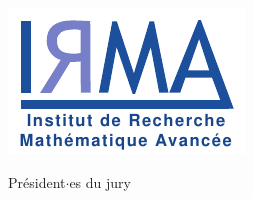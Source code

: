{\begin{minipage}[c]{6in}
\begin{minipage}[c]{1.5in}
    \end{minipage}
    \hfill
    \begin{minipage}[c]{1.5in}
        \includegraphics[width=.92\linewidth]{logos/logo-irma.pdf}
    \end{minipage}
    \hfill
\end{minipage}
%
\hfill
%
\begin{minipage}[c]{2.8in}
    \sigskip \signature{}{\vspace{3pt}Président$\cdot$es du jury}
\end{minipage}}